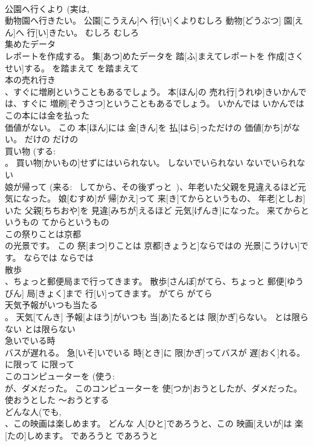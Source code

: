 \documentclass[8pt]{extreport}
\begin{document}
\begin{CJK}{UTF8}{min}
\\	公園へ行くより (実は, 
\\	動物園へ行きたい。	公園[こうえん]へ 行[い]くよりむしろ 動物[どうぶつ] 園[えん]へ 行[い]きたい。	むしろ	むしろ	
\\	集めたデータ 
\\	レポートを作成する。	集[あつ]めたデータを 踏[ふ]まえてレポートを 作成[さくせい]する。	を踏まえて	を踏まえて	
\\	本の売れ行き 
\\	、すぐに増刷ということもあるでしょう。	本[ほん]の 売れ行[うれゆ]きいかんでは、すぐに 増刷[ぞうさつ]ということもあるでしょう。	いかんでは	いかんでは	
\\	この本には金を払った 
\\	価値がない。	この 本[ほん]には 金[きん]を 払[はら]っただけの 価値[かち]がない。	だけの	だけの	
\\	買い物 (する: 
\\	。	買い物[かいもの]せずにはいられない。	しないでいられない	ないでいられない	
\\	娘が帰って (来る: ~してから、その後ずっと~)、年老いた父親を見違えるほど元気になった。	娘[むすめ]が 帰[かえ]って 来[き]てからというもの、 年老[としお]いた 父親[ちちおや]を 見違[みちが]えるほど 元気[げんき]になった。	来てからというもの	てからというもの	
\\	この祭りことは京都 
\\	の光景です。	この 祭[まつ]りことは 京都[きょうと]ならではの 光景[こうけい]です。	ならでは	ならでは	
\\	散歩 
\\	、ちょっと郵便局まで行ってきます。	散歩[さんぽ]がてら、ちょっと 郵便[ゆうびん] 局[きょく]まで 行[い]ってきます。	がてら	がてら	
\\	天気予報がいつも当たる 
\\	。	天気[てんき] 予報[よほう]がいつも 当[あ]たるとは 限[かぎ]らない。	とは限らない	とは限らない	
\\	急いでいる時 
\\	バスが遅れる。	急[いそ]いでいる 時[とき]に 限[かぎ]ってバスが 遅[おく]れる。	に限って	に限って	
\\	このコンピューターを (使う: 
\\	が、ダメだった。	このコンピューターを 使[つか]おうとしたが、ダメだった。	使おうとした	～おうとする	
\\	どんな人(でも, 
\\	、この映画は楽しめます。	どんな 人[ひと]であろうと、この 映画[えいが]は 楽[たの]しめます。	であろうと	であろうと	

\end{CJK}
\end{document}
